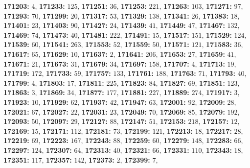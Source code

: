 \textsf{\bfseries 171203:} $4$, \textsf{\bfseries 171233:} $125$, \textsf{\bfseries 171251:} $36$, \textsf{\bfseries 171253:} $221$, \textsf{\bfseries 171263:} $103$, \textsf{\bfseries 171271:} $97$, \textsf{\bfseries 171293:} $70$, \textsf{\bfseries 171299:} $20$, \textsf{\bfseries 171317:} $53$, \textsf{\bfseries 171329:} $138$, \textsf{\bfseries 171341:} $26$, \textsf{\bfseries 171383:} $18$, \textsf{\bfseries 171401:} $23$, \textsf{\bfseries 171403:} $90$, \textsf{\bfseries 171427:} $24$, \textsf{\bfseries 171439:} $41$, \textsf{\bfseries 171449:} $47$, \textsf{\bfseries 171467:} $132$, \textsf{\bfseries 171469:} $74$, \textsf{\bfseries 171473:} $40$, \textsf{\bfseries 171481:} $222$, \textsf{\bfseries 171491:} $15$, \textsf{\bfseries 171517:} $151$, \textsf{\bfseries 171529:} $124$, \textsf{\bfseries 171539:} $60$, \textsf{\bfseries 171541:} $263$, \textsf{\bfseries 171553:} $52$, \textsf{\bfseries 171559:} $50$, \textsf{\bfseries 171571:} $121$, \textsf{\bfseries 171583:} $36$, \textsf{\bfseries 171617:} $65$, \textsf{\bfseries 171629:} $10$, \textsf{\bfseries 171637:} $2$, \textsf{\bfseries 171641:} $206$, \textsf{\bfseries 171653:} $27$, \textsf{\bfseries 171659:} $41$, \textsf{\bfseries 171671:} $21$, \textsf{\bfseries 171673:} $31$, \textsf{\bfseries 171679:} $34$, \textsf{\bfseries 171697:} $158$, \textsf{\bfseries 171707:} $4$, \textsf{\bfseries 171713:} $19$, \textsf{\bfseries 171719:} $172$, \textsf{\bfseries 171733:} $59$, \textsf{\bfseries 171757:} $133$, \textsf{\bfseries 171761:} $188$, \textsf{\bfseries 171763:} $71$, \textsf{\bfseries 171793:} $40$, \textsf{\bfseries 171799:} $4$, \textsf{\bfseries 171803:} $17$, \textsf{\bfseries 171811:} $225$, \textsf{\bfseries 171823:} $84$, \textsf{\bfseries 171827:} $69$, \textsf{\bfseries 171851:} $123$, \textsf{\bfseries 171863:} $3$, \textsf{\bfseries 171869:} $34$, \textsf{\bfseries 171877:} $177$, \textsf{\bfseries 171881:} $227$, \textsf{\bfseries 171889:} $274$, \textsf{\bfseries 171917:} $3$, \textsf{\bfseries 171923:} $10$, \textsf{\bfseries 171929:} $62$, \textsf{\bfseries 171937:} $42$, \textsf{\bfseries 171947:} $63$, \textsf{\bfseries 172001:} $92$, \textsf{\bfseries 172009:} $28$, \textsf{\bfseries 172021:} $67$, \textsf{\bfseries 172027:} $22$, \textsf{\bfseries 172031:} $23$, \textsf{\bfseries 172049:} $70$, \textsf{\bfseries 172069:} $85$, \textsf{\bfseries 172079:} $192$, \textsf{\bfseries 172093:} $50$, \textsf{\bfseries 172097:} $29$, \textsf{\bfseries 172127:} $88$, \textsf{\bfseries 172147:} $51$, \textsf{\bfseries 172153:} $218$, \textsf{\bfseries 172157:} $12$, \textsf{\bfseries 172169:} $15$, \textsf{\bfseries 172171:} $112$, \textsf{\bfseries 172181:} $73$, \textsf{\bfseries 172199:} $121$, \textsf{\bfseries 172213:} $18$, \textsf{\bfseries 172217:} $28$, \textsf{\bfseries 172219:} $69$, \textsf{\bfseries 172223:} $167$, \textsf{\bfseries 172243:} $88$, \textsf{\bfseries 172259:} $60$, \textsf{\bfseries 172279:} $148$, \textsf{\bfseries 172283:} $66$, \textsf{\bfseries 172297:} $124$, \textsf{\bfseries 172307:} $64$, \textsf{\bfseries 172313:} $40$, \textsf{\bfseries 172321:} $66$, \textsf{\bfseries 172331:} $110$, \textsf{\bfseries 172343:} $18$, \textsf{\bfseries 172351:} $117$, \textsf{\bfseries 172357:} $142$, \textsf{\bfseries 172373:} $2$, \textsf{\bfseries 172399:} $7$, 

